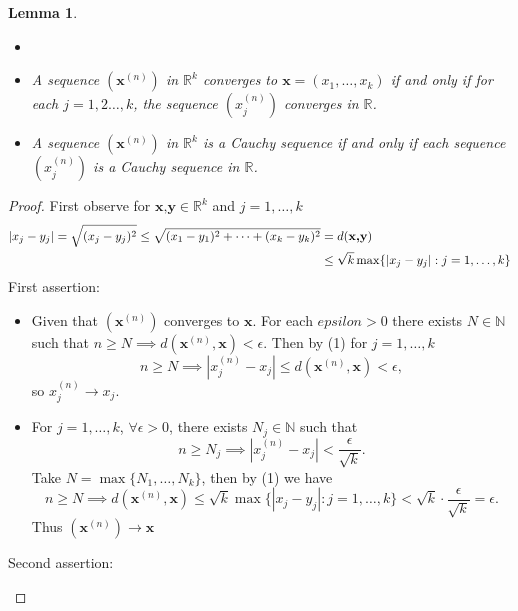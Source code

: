 \documentclass[12pt, lettersize]{book}
\theoremstyle{plain}
\newtheorem{lem}[thm]{Lemma}
\theoremstyle{definition}
\theoremstyle{remark}
\newcommand{\N}{\mathbb{N}}
\begin{document}
		\setcounter{equation}{0}
		\begin{lem}\label{def:sequence in R^k}
			\begin{itemize}
				\item[]
				\item A sequence $(\mathbf{x}^{(n)})$ in $\mathbb{R}^k$ converges to $\mathbf{x}=(x_1,\dots,x_k)$ if and only if for each $j=1,2\dots,k$, the sequence $(x_j^{(n)})$ converges in $\mathbb{R}$.
				\item A sequence $(\mathbf{x}^{(n)})$ in $\mathbb{R}^k$ is a Cauchy sequence if and only if each sequence $(x_j^{(n)})$ is a Cauchy sequence in $\mathbb{R}$.
			\end{itemize}	
		\end{lem}
		\begin{proof}
			First observe for $\textbf{x,y}\in\mathbb{R}^k$ and $j=1,\dots,k$
			\begin{align}
				|x_j-y_j|=\sqrt{(x_j-y_j)^2}\leq\sqrt{(x_1-y_1)^2+\cdots+(x_k-y_k)^2}&=d(\textbf{x,y})\notag\\
				&\leq \sqrt{k}\max\{|x_j-y_j|: j=1,\dots,k\}
			\end{align}
			First assertion: 
			\begin{itemize}
				\item[$\implies$:] Given that $(\textbf{x}^{(n)})$ converges to $\mathbf{x}$. For each $epsilon>0$ there exists $N\in\N$ such that $n\geq N\implies d(\textbf{x}^{(n)},\mathbf{x})<\epsilon$. Then by (1) for $j=1,\dots,k$
				\begin{displaymath}
					n\geq N\implies |x_j^{(n)}-x_j|\leq d(\textbf{x}^{(n)},\mathbf{x})<\epsilon,
				\end{displaymath}
				so $x_j^{(n)}\rightarrow x_j$.
				\item[$\impliedby$:] For $j=1,\dots,k$, $\forall \epsilon>0$, there exists $N_j\in\N$ such that 
				\begin{displaymath}
					n\geq N_j\implies |x_j^{(n)}-x_j|<\frac{\epsilon}{\sqrt{k}}.
				\end{displaymath}
				Take $N=\max\{N_1,\dots,N_k\}$, then by (1) we have
				\begin{displaymath}
					n\geq N\implies d(\textbf{x}^{(n)},\mathbf{x})\leq\sqrt{k}\max\{|x_j-y_j|: j=1,\dots,k\}<\sqrt{k}\cdot\frac{\epsilon}{\sqrt{k}}=\epsilon.
				\end{displaymath}
				Thus $(\textbf{x}^{(n)})\rightarrow\mathbf{x}$
			\end{itemize}
			Second assertion:	
			\begin{itemize}

\end{itemize}
\end{proof}
\end{document}
